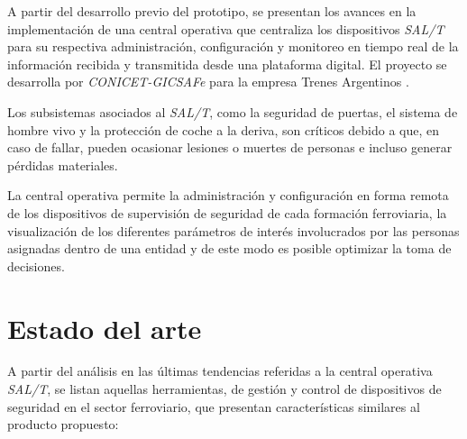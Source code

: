 A partir del desarrollo previo del prototipo, se presentan los avances en la implementación de una central operativa que centraliza los dispositivos \textit{SAL/T} para su respectiva administración, configuración y monitoreo en tiempo real de la información recibida y transmitida desde una plataforma digital. El proyecto se desarrolla por \textit{CONICET-GICSAFe} \citep{gicsafe} para la empresa Trenes Argentinos \citep{trenes-argentinos}.

Los subsistemas asociados al \textit{SAL/T}, como la seguridad de puertas, el sistema de hombre vivo y la protección de coche a la deriva, son críticos debido a que, en caso de fallar, pueden ocasionar lesiones o muertes de personas e incluso generar pérdidas materiales.

La central operativa permite la administración y configuración en forma remota de los dispositivos de supervisión de seguridad de cada formación ferroviaria, la visualización de los diferentes parámetros de interés involucrados por las personas asignadas dentro de una entidad y de este modo es posible optimizar la toma
de decisiones.



%

\section{Estado del arte}

A partir del análisis en las últimas tendencias referidas a la central operativa \textit{SAL/T}, se listan aquellas herramientas, de gestión y control de dispositivos de seguridad en el sector ferroviario, que presentan características similares al producto propuesto:

